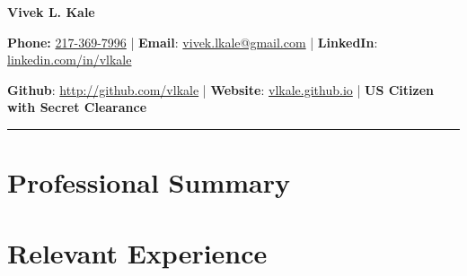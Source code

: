 \documentclass[11pt]{article}
\begin{document}
 

\begin{center}
\selectfont
    \Large \textbf{Vivek L. Kale} \\
    \normalsize

   \textbf{Phone:} \href{tel: +01 217-369-7996}{217-369-7996} | \textbf{Email}: \href{mailto:vivek.lkale@gmail.com}{vivek.lkale@gmail.com} | 
      \textbf{LinkedIn}: \href{http://linkedin.com/in/vlkale}{linkedin.com/in/vlkale} 

\textbf{Github}: \href{http://github.com/vlkale}{http://github.com/vlkale} | \textbf{Website}: \href{http://vlkale.github.io}{vlkale.github.io} | \textbf{US Citizen with Secret Clearance}
\end{center}
\noindent\rule{\linewidth}{0.4pt}


%

\section*{\selectfont Professional Summary}


\section*{\selectfont Relevant Experience}
 

\end{document}
